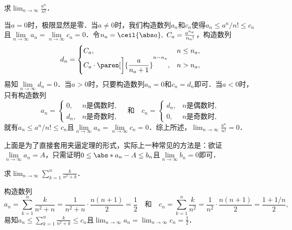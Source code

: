 \begin{example}
  \label{eg:factexp}
  求\(\displaystyle \lim_{n\to\infty} \frac{a^n}{n!}\)．\rule[-2ex]{0ex}{0ex}

  \begin{remark}
    当\(a = 0\)时，极限显然是零．当\(a \ne 0\)时，我们构造数列\(a_n\)和\(c_n\)使得\(a_n \le a^n\!/n! \le c_n\)且\(\lim\limits_{n\to\infty} a_n = \lim\limits_{n\to\infty} c_n = 0\)．令\(n_a = \ceil{\abs a},\ C_a = \frac{a^{n_a}}{n_a!}\)，构造数列
    \begin{equation*}
      d_n =
      \begin{cases}
        C_a, & n \le n_a, \\
        C_a \cdot \paren[\bigg]{\dfrac{a}{n_a + 1}}^{n-n_a}, & n > n_a,
      \end{cases}
    \end{equation*}
    易知\(\lim\limits_{n\to\infty} d_n = 0\)．当\(a > 0\)时，只要构造数列\(a_n = 0\)和\(c_n = d_n\)即可．当\(a < 0\)时，只有构造数列
    \begin{equation*}
      a_n =
      \begin{cases}
        0, & \text{\(n\)是偶数时}, \\
        d_n, & \text{\(n\)是奇数时},
      \end{cases}
      \quad\text{和}\quad
      c_n =
      \begin{cases}
        d_n, & \text{\(n\)是偶数时}, \\
        0, & \text{\(n\)是奇数时},
      \end{cases}
    \end{equation*}
    就有\(a_n \le a^n\!/n! \le c_n\)且\(\lim\limits_{n\to\infty} a_n = \lim\limits_{n\to\infty} c_n = 0\)．综上所述，\(\displaystyle \lim_{n\to\infty} \frac{a^n}{n!} = 0\)．\rule[-2ex]{0ex}{0ex}

    上面是为了直接套用夹逼定理的形式，实际上一种常见的方法是：欲证\(\lim\limits_{n\to\infty} a_n = A\)，只需证明\(0 \le \abs*{a_n - A} \le b_n\)且\(\lim\limits_{n\to\infty} b_n = 0\)即可．
  \end{remark}
\end{example}

\begin{example*}
  求\(\displaystyle \lim_{n\to\infty} \sum_{k=1}^n \frac{k}{n^2+k}\)．

  \begin{remark}
    构造数列
    \begin{equation*}
      a_n
      = \sum_{k=1}^n \frac{k}{n^2 + n}
      = \frac{1}{n^2 + n} \cdot \frac{n(n+1)}{2}
      = \frac12
      \quad\text{和}\quad
      c_n
      = \sum_{k=1}^n \frac{k}{n^2}
      = \frac{1}{n^2} \cdot \frac{n(n+1)}{2}
      = \frac{1 + 1/n}{2},
    \end{equation*}
    易知\(\displaystyle a_n \le \sum\limits_{k=1}^n \frac{k}{n^2+k} \le c_n\)且\(\displaystyle \lim_{n\to\infty} a_n = \lim_{n\to\infty} c_n = \frac12\)．\rule[-3ex]{0ex}{0ex}
  \end{remark}
\end{example*}

